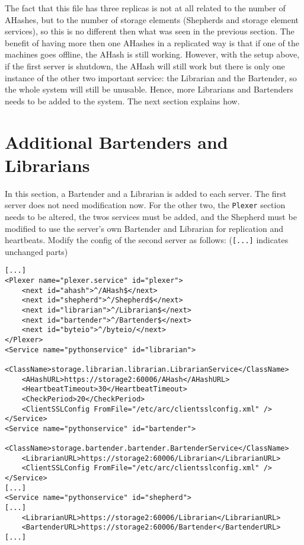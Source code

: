 \documentclass{article}
\begin{document}
The fact that this file has three replicas is not at all related to the number of AHashes, but to the number of storage elements (Shepherds and storage element services), so this is no different then what was seen in the previous section. The benefit of having more then one AHashes in a replicated way is that if one of the machines goes offline, the AHash is still working. However, with the setup above, if the first server is shutdown, the AHash will still work but there is only one instance of the other two important service: the Librarian and the Bartender, so the whole system will still be unusable. Hence, more Librarians and Bartenders needs to be added to the system. The next section explains how.

\section{Additional Bartenders and Librarians} %
\label{sec:additional_bartenders_and_librarians}

In this section, a Bartender and a Librarian is added to each server. The first server does not need modification now. For the other two, the \verb!Plexer! section needs to be altered, the twos services must be added, and the Shepherd must be modified to use the server's own Bartender and Librarian for replication and heartbeats. Modify the config of the second server as follows: (\verb![...]! indicates unchanged parts)

\begin{verbatim}
[...]
<Plexer name="plexer.service" id="plexer">
    <next id="ahash">^/AHash$</next>
    <next id="shepherd">^/Shepherd$</next>
    <next id="librarian">^/Librarian$</next>
    <next id="bartender">^/Bartender$</next>
    <next id="byteio">^/byteio/</next>
</Plexer>
<Service name="pythonservice" id="librarian">
    <ClassName>storage.librarian.librarian.LibrarianService</ClassName>
    <AHashURL>https://storage2:60006/AHash</AHashURL>
    <HeartbeatTimeout>30</HeartbeatTimeout>
    <CheckPeriod>20</CheckPeriod>
    <ClientSSLConfig FromFile="/etc/arc/clientsslconfig.xml" />
</Service>
<Service name="pythonservice" id="bartender">
    <ClassName>storage.bartender.bartender.BartenderService</ClassName>
    <LibrarianURL>https://storage2:60006/Librarian</LibrarianURL>
    <ClientSSLConfig FromFile="/etc/arc/clientsslconfig.xml" />
</Service>
[...]
<Service name="pythonservice" id="shepherd">
[...]
    <LibrarianURL>https://storage2:60006/Librarian</LibrarianURL>
    <BartenderURL>https://storage2:60006/Bartender</BartenderURL>
[...]
\end{verbatim}
\end{document}
